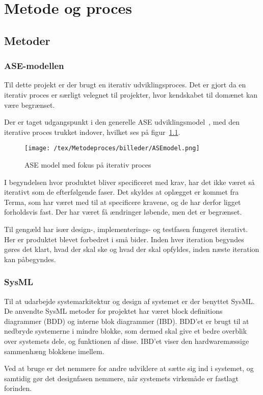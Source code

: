 \chapter{Metode og proces}

\section{Metoder}

\subsection{ASE-modellen}
Til dette projekt er der brugt en iterativ udviklingsproces. Det er gjort da en iterativ proces er særligt velegnet til projekter, hvor kendskabet til domænet kan være begrænset. 

Der er taget udgangspunkt i den generelle ASE udviklingsmodel~\cite{udviklingsproces}, med den iterative proces trukket indover, hvilket ses på figur~\ref{fig:ASE}.
\begin{figure}[H]
	\center
	\texttt{[image: /tex/Metodeproces/billeder/ASEmodel.png]}
	\caption{ASE model med fokus på iterativ proces}
	\label{fig:ASE}
\end{figure}  
I begyndelsen hvor produktet bliver specificeret med krav, har det ikke været så iterativt som de efterfølgende faser. Det skyldes at oplægget er kommet fra Terma, som har været med til at specificere kravene, og de har derfor ligget forholdsvis fast. Der har været få ændringer løbende, men det er begrænset.

Til gengæld har især design-, implementerings- og testfasen fungeret iterativt. Her er produktet blevet forbedret i små bider. Inden hver iteration begyndes gøres det klart, hvad der skal ske og hvad der skal opfyldes, inden næste iteration kan påbegyndes. 

\subsection{SysML}
Til at udarbejde systemarkitektur og design af systemet er der benyttet SysML. De anvendte SysML metoder for projektet har været block definitions diagrammer (BDD) og interne blok diagrammer (IBD). BDD'et er brugt til at nedbryde systemerne i mindre blokke, som dermed skal give et bedre overblik over systemets dele, og funktionen af disse. IBD'et viser den hardwaremæssige sammenhæng blokkene imellem.    

Ved at bruge er det nemmere for andre udviklere at sætte sig ind i systemet, og samtidig gør det designfasen nemmere, når systemets virkemåde er fastlagt forinden.

